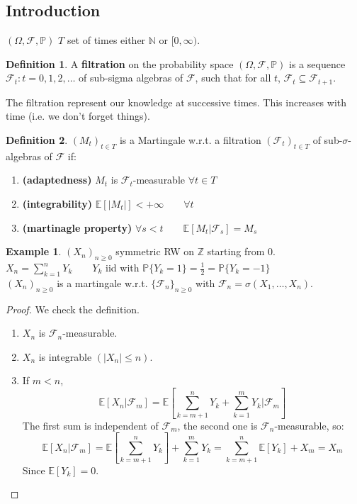 \documentclass[10pt,a4paper]{article}
\theoremstyle{definition}
\newtheorem{defi}{Definition}[section]
\newtheorem{exi}{Example}[section]
\begin{document}
\subsection{Introduction}
$ (\Omega,\mathcal{F},\mathbb{P}) $ $T$ set of times either $\mathbb{N}$ or $[0,\infty)$.
\begin{defi}
	A \textbf{filtration} on the probability space $ (\Omega,\mathcal{F},\mathbb{P})$ is a sequence ${\mathcal{F}_{t}:t=0,1,2, \ldots}$ of sub-sigma algebras of $\mathcal{F}$, such that for all $t$, $\mathcal{F}_{t} \subseteq \mathcal{F}_{t+1}$.
\end{defi}
The filtration represent our knowledge at successive times. This increases with time (i.e. we don't forget things).
\begin{defi}
	$(M_t)_{t\in T}$ is a Martingale w.r.t. a filtration $(\mathcal{F}_t)_{t\in T}$ of sub-$\sigma$-algebras of $\mathcal{F}$ if:
	\begin{enumerate}
		\item \textbf{(adaptedness)} $M_t$ is $\mathcal{F}_t$-measurable $\forall t\in T$
		\item \textbf{(integrability)} $\mathbb{E}[|M_t|]<+\infty \qquad\forall t$
		\item \textbf{(martinagle property)} $\forall s<t \qquad \mathbb{E}[M_t|\mathcal{F}_s]=M_s$
	\end{enumerate}
\end{defi}
\begin{exi}
	$(X_n)_{n\geq0}$ symmetric RW on $\mathbb{Z}$ starting from $0$.\\
	$X_n=\sum_{k=1}^{n}Y_k \qquad Y_k$ iid with $\mathbb{P}\{Y_k=1\}=\frac{1}{2}=\mathbb{P}\{Y_k=-1\}$ \\
	$(X_n)_{n\geq0}$ is a martingale w.r.t. $\{\mathcal{F}_n\}_{n\geq0}$ with $\mathcal{F}_n=\sigma(X_1,\ldots,X_n)$.
\end{exi}
\begin{proof}
	We check the definition.
	\begin{enumerate}
		\item $X_n$ is $\mathcal{F}_n$-measurable.
		\item $X_n$ is integrable $(|X_n|\leq n)$.
		\item If $m<n$,
		\begin{equation*}
			\mathbb{E}[X_n|\mathcal{F}_m]=\mathbb{E}\left[ \sum_{k=m+1}^{n}Y_k+\sum_{k=1}^{m}Y_k|\mathcal{F}_m \right]  
		\end{equation*}
		The first sum is independent of $\mathcal{F}_m$, the second one is $\mathcal{F}_n$-measurable, so:
		\begin{equation*}
			\mathbb{E}[X_n|\mathcal{F}_m]=\mathbb{E}\left[ \sum_{k=m+1}^{n}Y_k \right]  +\sum_{k=1}^{m}Y_k=\sum_{k=m+1}^{n}\mathbb{E}[Y_k]+X_m=X_m
		\end{equation*}
	Since $\mathbb{E}[Y_k]=0$.
	\end{enumerate}
\end{proof}
\end{document}

